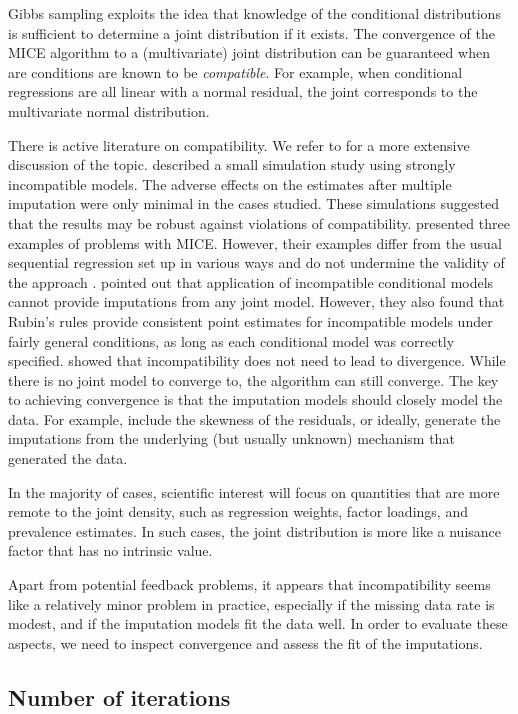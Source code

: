 \documentclass[
]{book}
\begin{document}
Gibbs sampling exploits the idea that knowledge of the conditional distributions is sufficient to determine a joint distribution if it exists. The convergence of the MICE algorithm to a (multivariate) joint distribution can be guaranteed when are conditions are known to be \emph{compatible}. For example, when conditional regressions are all linear with a normal residual, the joint corresponds to the multivariate normal distribution.

There is active literature on compatibility. We refer to \citet{VANBUUREN2018} for a more extensive discussion of the topic. \citet{VANBUUREN2006} described a small simulation study using strongly incompatible models. The adverse effects on the estimates after multiple imputation were only minimal in the cases studied. These simulations suggested that the results may be robust against violations of compatibility. \citet{LI2012} presented three examples of problems with MICE. However, their examples differ from the usual sequential regression set up in various ways and do not undermine the validity of the approach \citep{ZHU2015}. \citet{LIU2013} pointed out that application of incompatible conditional models cannot provide imputations from any joint model. However, they also found that Rubin's rules provide consistent point estimates for incompatible models under fairly general conditions, as long as each conditional model was correctly specified. \citet{ZHU2015} showed that incompatibility does not need to lead to divergence. While there is no joint model to converge to, the algorithm can still converge. The key to achieving convergence is that the imputation models should closely model the data. For example, include the skewness of the residuals, or ideally, generate the imputations from the underlying (but usually unknown) mechanism that generated the data.

In the majority of cases, scientific interest will focus on quantities
that are more remote to the joint density, such as regression weights,
factor loadings, and prevalence estimates. In such cases, the
joint distribution is more like a nuisance factor that has no intrinsic
value.

Apart from potential feedback problems, it appears that incompatibility
seems like a relatively minor problem in practice, especially if the
missing data rate is modest, and if the imputation models fit the data well.
In order to evaluate these aspects, we need to inspect convergence and
assess the fit of the imputations.

\hypertarget{sec:howlarget}{%
\subsection{Number of iterations}\label{sec:howlarget}}
\end{document}
